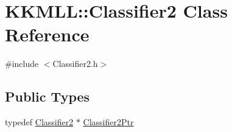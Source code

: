 \hypertarget{class_k_k_m_l_l_1_1_classifier2}{}\section{K\+K\+M\+LL\+:\+:Classifier2 Class Reference}
\label{class_k_k_m_l_l_1_1_classifier2}


{\ttfamily \#include $<$Classifier2.\+h$>$}

\subsection*{Public Types}
\begin{DoxyCompactItemize}
\item 
typedef \hyperlink{class_k_k_m_l_l_1_1_classifier2}{Classifier2} $\ast$ \hyperlink{class_k_k_m_l_l_1_1_classifier2_a7deeb46168b2911c5b8629dd4f45483f}{Classifier2\+Ptr}
\end{DoxyCompactItemize}
